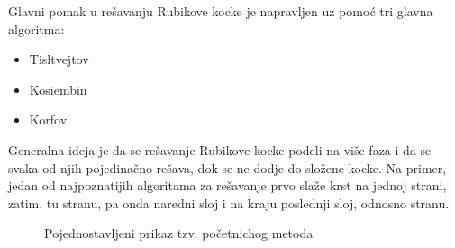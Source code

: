 \documentclass[a4paper]{article}
\begin{document}
Glavni pomak u rešavanju Rubikove kocke je napravljen uz pomoć tri glavna algoritma:

\begin{itemize}
\item Tisltvejtov
\item Kosiembin
\item Korfov
\end{itemize} 

 Generalna ideja je da se rešavanje Rubikove kocke podeli na više faza i da se svaka od njih pojedinačno rešava, dok se ne dodje do složene kocke.
Na primer, jedan od najpoznatijih algoritama za rešavanje prvo slaže krst na jednoj strani, zatim, tu stranu, pa onda naredni sloj i na kraju poslednji sloj, odnosno stranu.

\begin{figure}[h!]
        \centering
        \caption{Pojednostavljeni prikaz tzv. početnichog metoda}
        \label{fig:beginners-method}
    \end{figure}
\end{document}
